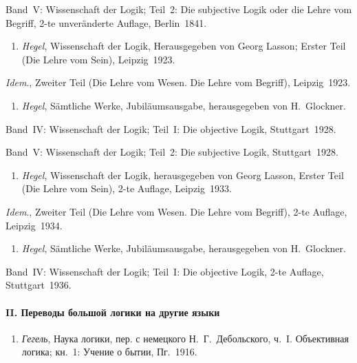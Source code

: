 Band~V: Wissenschaft der Logik; Teil~2: Die subjective Logik oder die Lehre
vom Begriff, 2-te unveränderte Auflage, Berlin~1841.


\begin{enumerate}
\item
{\em Hegel}, Wissenschaft der Logik, Herausgegeben von Georg Lasson;
Erster Teil (Die Lehre vom Sein), Leipzig~1923.
\end{enumerate}

{\em Idem}., Zweiter Teil (Die Lehre vom Wesen. Die Lehre vom Begriff),
Leipzig~1923.

\begin{enumerate}
\item
{\em Hegel}, Sämtliche Werke, Jubiläumsausgabe, herausgegeben von
H.~Glockner.
\end{enumerate}

Band~IV: Wissenschaft der Logik; Teil~I: Die objective Logik,
Stuttgart~1928.

Band~V: Wissenschaft der Logik; Teil~2: Die subjective Logik,
Stuttgart~1928.

\begin{enumerate}
\item
{\em Hegel}, Wissenschaft der Logik, herausgegeben von Georg Lasson,
Erster Teil (Die Lehre vom Sein), 2-te Auflage, Leipzig~1933.
\end{enumerate}

{\em Idem}., Zweiter Teil (Die Lehre vom Wesen. Die Lehre vom Begriff),
2-te Auflage, Leipzig~1934.

\begin{enumerate}
\item
{\em Hegel}, Sämtliche Werke, Jubiläumsausgabe, herausgegeben von
H.~Glockner.
\end{enumerate}

Band~IV: Wissenschaft der Logik; Teil~I: Die objective Logik, 2-te Auflage,
Stuttgart~1936.

\paragraph[II. Переводы большой логики на другие языки]
{II. Переводы большой логики на другие языки }

\begin{enumerate}
\item
{\em Гегель}, Наука логики, пер. с немецкого Н.~Г.~Дебольского, ч.~I.
Объективная логика; кн.~1: Учение о бытии, Пг.~1916.
\end{enumerate}

